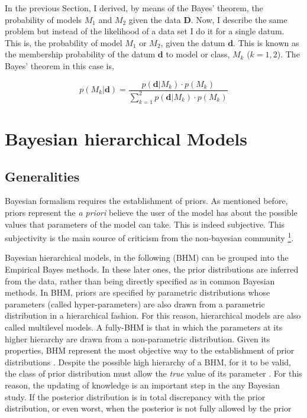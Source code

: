 In the previous Section, I derived, by means of the Bayes' theorem, the probability of models $M_1$ and $M_2$ given the data $\mathbf{D}$. Now, I describe the same problem but instead of the likelihood of a data set I do it for a single datum. This is, the probability of model $M_1$ or $M_2$, given the datum $\mathbf{d}$. This is known as the membership probability of the datum $\mathbf{d}$ to model or class, $M_k$ ($k=1,2$). The Bayes' theorem in this case is,

\begin{equation}
p( M_k | \mathbf{d}) =\frac{p(\mathbf{d}|M_k)\cdot p(M_k)}{\sum_{k=1}^2 p(\mathbf{d}|M_k)\cdot p(M_k)} 
\end{equation}

\section{Bayesian hierarchical Models}
\subsection{Generalities}
Bayesian formalism requires the establishment of priors. As mentioned before, priors represent the \emph{a priori} believe the user of the model has about the possible values that parameters of the model can take. This is indeed subjective. This subjectivity is the main source of criticism from the non-bayesian community \footnote{See \citep{Gelman2012} for a discussion on the ethical use of prior information}. 

Bayesian hierarchical models, in the following (BHM) can be grouped into the Empirical Bayes methods. In these later ones, the prior distributions are inferred from the data, rather than being directly specified as in common Bayesian methods. In BHM, priors are specified by parametric distributions whose parameters (called hyper-parameters) are also drawn from a parametric distribution in a hierarchical fashion. For this reason, hierarchical models are also called multilevel models. A fully-BHM is that in which the parameters at its higher hierarchy are drawn from a non-parametric distribution. Given its properties, BHM represent the most objective way to the establishment of prior distributions \citep{Gelman2006}. Despite the possible high hierarchy of a BHM, for it to be valid, the class of prior distribution must allow the \emph{true} value of its parameter \citep{Morris1983}. For this reason, the updating of knowledge is an important step in the any Bayesian study. If the posterior distribution is in total discrepancy with the prior distribution, or even worst, when the posterior is not fully allowed by the prior distribution (as in a truncated prior for example), then we must update our prior and allow the data to be fully expressed. Otherwise, the posterior could be biased.

